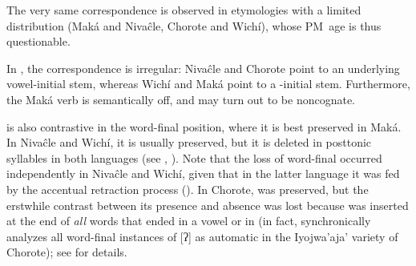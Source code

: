 \begin{exe}
    \ex \ask
    \ex \knee
    \ex \femalebreast
    \ex \hurt
    \ex \stepv
    \ex \skin
    \ex \eatvi
    \ex \meat
    \ex \teach
    \ex \othern
    \ex \juice
    \ex \dryout
    \ex \good
    \ex \extinguished
    \ex \ripe
    \ex \chest
    \ex \urinate
    \ex \urine
\end{exe}

The very same correspondence is observed in etymologies with a limited distribution (Maká and Nivaĉle, Chorote and Wichí), whose PM~age is thus questionable.

\begin{exe}
    \ex \fatalha
    \ex \cord
    \ex \yawn
    \ex \ashamedcw
    \ex \diecw
    \ex \heartcw
\end{exe}

In , the correspondence is irregular: Nivaĉle and Chorote point to an underlying vowel-initial stem, whereas Wichí and Maká point to a \mbox{-}initial stem. Furthermore, the Maká verb is semantically off, and may turn out to be noncognate.

\begin{exe}
    \ex \shout\label{glottalshout}
\end{exe}

 is also contrastive in the word-final position, where it is best preserved in Maká. In Nivaĉle and Wichí, it is usually preserved, but it is deleted in posttonic syllables in both languages (see , ). Note that the loss of word-final  occurred independently in Nivaĉle and Wichí, given that in the latter language it was fed by the accentual retraction process (). In Chorote,  was preserved, but the erstwhile contrast between its presence and absence was lost because  was inserted at the end of \emph{all} words that ended in a vowel or in  (in fact,  synchronically analyzes all word-final instances of [ʔ] as automatic in the Iyojwa’aja’ variety of Chorote); see  for details.

\begin{exe}
    \ex \fruit
    \ex \mouth
    \ex \daughter
    \ex \coal
    \ex \soninlaw
    \ex \welln
    \ex \drinkv
    \ex \treen
    \ex \vulture
    \ex \arrowkaxe
    \ex \feminine
    \ex \elderbro
    \ex \eldersis
    \ex \youngersis
    \ex \pet
    \ex \louse
    \ex \mucus
    \ex \sleepiness
    \ex \cavy
    \ex \seed
    \ex \fatpe
    \ex \beard
    \ex \leg
    \ex \dinlaw
    \ex \eyelash
    \ex \eye
    \ex \face
    \ex \eyebrow
    \ex \rheum
    \ex \woodpecker
    \ex \demwa
    \ex \bromelia
    \ex \expert
    \ex \rib
    \ex \bat
    \ex \vrbpl
    \ex \maguari
    \ex \mosquito
    \ex \pigeon
\end{exe}

